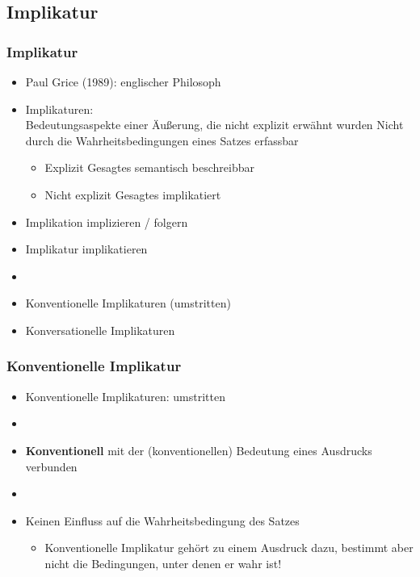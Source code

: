 %
\subsection{Implikatur}
%


\begin{frame}
\frametitle{Implikatur}

\begin{itemize}
	\item Paul Grice (1989): englischer Philosoph
	\item Implikaturen:\\
Bedeutungsaspekte einer Äu\ss{}erung, die nicht explizit erwähnt wurden \ras Nicht durch die Wahrheitsbedingungen eines Satzes erfassbar

	\begin{itemize}
		\item Explizit Gesagtes \ras semantisch beschreibbar
		\item Nicht explizit Gesagtes \ras implikatiert
	\end{itemize}


	\item Implikation \ras implizieren / folgern
	\item Implikatur \ras implikatieren
	\item[]
	\item Konventionelle Implikaturen (umstritten)
	\item Konversationelle Implikaturen
\end{itemize}

\end{frame}



\begin{frame}
\frametitle{Konventionelle Implikatur}

\begin{itemize}
	\item Konventionelle Implikaturen: umstritten
	\item[]
	\item \textbf{Konventionell} \ras mit der (konventionellen) Bedeutung eines Ausdrucks verbunden
	\item[]
	\item Keinen Einfluss auf die Wahrheitsbedingung des Satzes
	
	\begin{itemize}
	\item Konventionelle Implikatur gehört zu einem Ausdruck dazu, bestimmt aber nicht die Bedingungen, unter denen er wahr ist!
	\end{itemize}
	
\end{itemize}

\end{frame}


